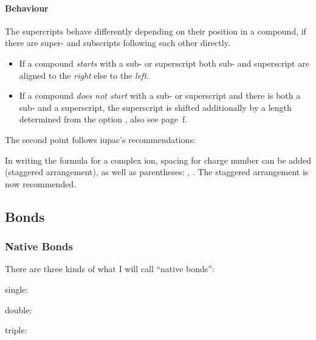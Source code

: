 \documentclass[load-preamble+]{cnltx-doc}
\begin{document}
\paragraph{Behaviour}
The supercripts behave differently depending on their position in a compound,
if there are super- and subscripts following each other directly.
\begin{example}
       \par
    
    \par
    
   
\end{example}
\begin{itemize}
  \item If a compound \emph{starts} with a sub- or superscript both sub- and
    superscript are aligned to the \emph{right} else to the \emph{left}.
  \item If a compound \emph{does not start} with a sub- or superscript and
    there is both a sub- and a superscript, the superscript is shifted
    additionally by a length determined from the option
    , also see page~\pageref{desc:charge-hshift}f.
\end{itemize}
The second point follows \ac{iupac}'s recommendations:
\begin{cnltxquote}
  In writing the formula for a complex ion, spacing for charge number can be
  added (staggered arrangement), as well as parentheses:
  , .  The staggered arrangement
  is now recommended.
\end{cnltxquote}

\subsection{Bonds}\label{ssec:bonds}
\subsubsection{Native Bonds}
There are three kinds of what I will call ``native bonds'':
\begin{example}
  single:  \par
  double:  \par
  triple: 
\end{example}
\end{document}
